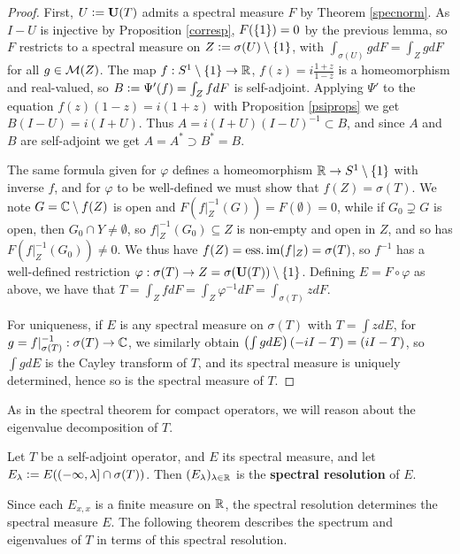\documentclass[10pt]{amsart}
\begin{document}
\begin{proof}
    First, $U \vcentcolon= \mathbf{U}(T)$ admits a spectral measure $F$ by Theorem \ref{specnorm}. As $I - U$ is injective by Proposition \ref{corresp}, $F(\left\{  1  \right\}) = 0$ by the previous lemma, so $F$ restricts to a spectral measure on $Z \vcentcolon= \sigma(U) \setminus \left\{  1  \right\}$, with $\int_{\sigma(U)} g dF = \int_Z g dF$ for all $g \in \mathcal{M}(Z)$. The map $f : S^1 \setminus \left\{  1  \right\} \to \mathbb{R}$, $f(z) = i\frac{1 + z}{1 - z}$ is a homeomorphism and real-valued, so $B \vcentcolon= \Psi'(f) = \int_Z f dF$ is self-adjoint. Applying $\Psi'$ to the equation $f(z)(1 - z) = i(1 + z)$ with Proposition \ref{psiprops} we get $B(I - U) = i(I + U)$. Thus $A = i(I + U)(I - U)^{-1} \subset B$, and since $A$ and $B$ are self-adjoint we get $A = A^* \supset B^* = B$.

    The same formula given for $\varphi$ defines a homeomorphism $\mathbb{R} \to S^1 \setminus \left\{  1  \right\}$ with inverse $f$, and for $\varphi$ to be well-defined we must show that $f(Z) = \sigma(T)$. We note $G = \mathbb{C} \setminus f(Z)$ is open and $F(f|_Z^{-1}(G)) = F(\emptyset) = 0$, while if $G_0 \supsetneq G$ is open, then $G_0 \cap Y \neq \emptyset$, so $f|_Z^{-1}(G_0) \subseteq Z$ is non-empty and open in $Z$, and so has $F(f|_Z^{-1}(G_0)) \neq 0$. We thus have $f(Z) = \operatorname{ess.im}(f|_Z) = \sigma(T)$, so $f^{-1}$ has a well-defined restriction $\varphi : \sigma(T) \to Z = \sigma(\mathbf{U}(T)) \setminus \left\{  1  \right\}$. Defining $E = F \circ \varphi$ as above, we have that $T = \int_Z f dF = \int_Z \varphi^{-1} dF = \int_{\sigma(T)} z dF$.

    For uniqueness, if $E$ is any spectral measure on $\sigma(T)$ with $T = \int z dE$, for $g = f|_{\sigma(T)}^{-1} : \sigma(T) \to \mathbb{C}$, we similarly obtain $\left(  \int g dE  \right)(-iI - T) = (iI - T)$, so $\int g dE$ is the Cayley transform of $T$, and its spectral measure is uniquely determined, hence so is the spectral measure of $T$.
\end{proof}
As in the spectral theorem for compact operators, we will reason about the eigenvalue decomposition of $T$. 
\begin{definition}
    Let $T$ be a self-adjoint operator, and $E$ its spectral measure, and let $E_\lambda \vcentcolon= E((-\infty, \lambda] \cap \sigma(T))$. Then $(E_\lambda)_{\lambda \in \mathbb{R}}$ is the \textbf{spectral resolution} of $E$.
\end{definition}
Since each $E_{x, x}$ is a finite measure on $\mathbb{R}$, the spectral resolution determines the spectral measure $E$. The following theorem describes the spectrum and eigenvalues of $T$ in terms of this spectral resolution.
\end{document}
